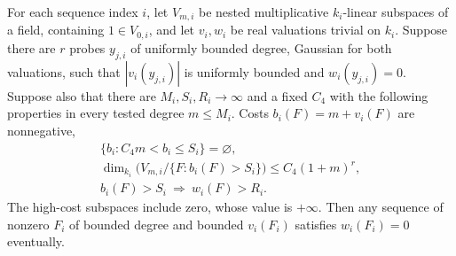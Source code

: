 \begin{lemma}\label{c:cheap-exact-zero}
For each sequence index $i$, let $V_{m,i}$ be nested multiplicative
$k_i$-linear subspaces of a field, containing $1\in V_{0,i}$,
and let $v_i,w_i$ be real
valuations trivial on $k_i$.  Suppose there are $r$ probes $y_{j,i}$
of uniformly bounded degree, Gaussian for both valuations, such that
$|v_i(y_{j,i})|$ is uniformly bounded and $w_i(y_{j,i})=0$.
Suppose also that there are $M_i,S_i,R_i\to\infty$ and a fixed
$C_4$ with the following properties in every tested degree
$m\le M_i$.  Costs $b_i(F)=m+v_i(F)$ are nonnegative,
\[
 \begin{gathered}
 \{b_i:C_4m<b_i\le S_i\}=\varnothing,\\
 \dim_{k_i}\bigl(V_{m,i}/\{F:b_i(F)>S_i\}\bigr)
                  \le C_4(1+m)^r,\\
               b_i(F)>S_i\ \Longrightarrow\ w_i(F)>R_i.
 \end{gathered}
\]
The high-cost subspaces include zero, whose value is $+\infty$.
Then any sequence of nonzero $F_i$ of bounded degree and bounded
$v_i(F_i)$ satisfies $w_i(F_i)=0$ eventually.
\end{lemma}

